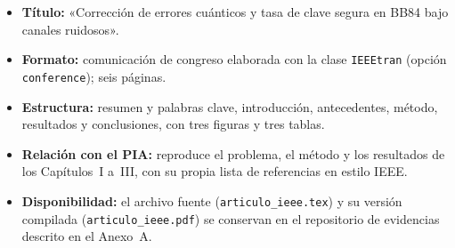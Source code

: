 \documentclass[12pt]{report}
\begin{document}
\begin{itemize}
    \item \textbf{Título:} «Corrección de errores cuánticos y tasa de clave
    segura en BB84 bajo canales ruidosos».
    \item \textbf{Formato:} comunicación de congreso elaborada con la clase
    \texttt{IEEEtran} (opción \texttt{conference}); seis páginas.
    \item \textbf{Estructura:} resumen y palabras clave, introducción,
    antecedentes, método, resultados y conclusiones, con tres figuras y tres
    tablas.
    \item \textbf{Relación con el PIA:} reproduce el problema, el método y los
    resultados de los Capítulos~I a~III, con su propia lista de referencias en
    estilo IEEE.
    \item \textbf{Disponibilidad:} el archivo fuente
    (\texttt{articulo\_ieee.tex}) y su versión compilada
    (\texttt{articulo\_ieee.pdf}) se conservan en el repositorio de evidencias
    descrito en el Anexo~A.
\end{itemize}


\end{document}
